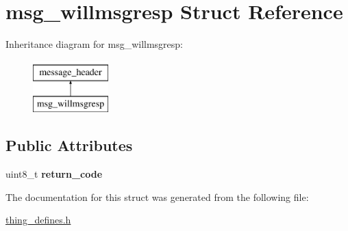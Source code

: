 \hypertarget{structmsg__willmsgresp}{\section{msg\-\_\-willmsgresp Struct Reference}
\label{structmsg__willmsgresp}
}
Inheritance diagram for msg\-\_\-willmsgresp\-:\begin{figure}[H]
\begin{center}
\leavevmode
\includegraphics[height=2.000000cm]{structmsg__willmsgresp}
\end{center}
\end{figure}
\subsection*{Public Attributes}
\begin{DoxyCompactItemize}
\item 
\hypertarget{structmsg__willmsgresp_abe4556de0f72082d28f175e39681fb98}{uint8\-\_\-t {\bfseries return\-\_\-code}}\label{structmsg__willmsgresp_abe4556de0f72082d28f175e39681fb98}

\end{DoxyCompactItemize}


The documentation for this struct was generated from the following file\-:\begin{DoxyCompactItemize}
\item 
\hyperlink{thing__defines_8h}{thing\-\_\-defines.\-h}\end{DoxyCompactItemize}
